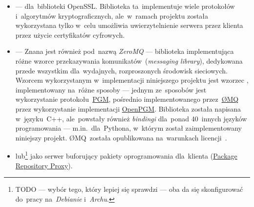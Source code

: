 \documentclass[thesis]{subfiles}
\begin{document}
\begin{itemize}
	\item {} ---  dla~biblioteki OpenSSL. Biblioteka ta~implementuje wiele protokołów i~algorytmów kryptograficznych, ale~w~ramach projektu została wykorzystana tylko w~celu umożliwia uwierzytelnienie serwera przez klienta przez użycie certyfikatów cyfrowych.
	\item {} --- Znana jest również pod~nazwą \emph{ZeroMQ} --- biblioteka implementująca różne wzorce przekazywania komunikatów~(\emph{messaging library}), dedykowana przede wszystkim dla~wydajnych, rozproszonych środowisk sieciowych. Wzorcem wykorzystanym w~implementacji niniejszego projektu jest wzorzec , implementowany na~różne sposoby --- jednym ze~sposobów jest wykorzystanie protokołu~\hyperref[sec:pgm]{PGM}, pośrednio implementowanego przez~\href{https://en.wikipedia.org/wiki/ZeroMQ}{ØMQ} przez wykorzystanie implementacji \href{https://github.com/steve-o/openpgm}{OpenPGM}. Biblioteka została napisana w~języku~C++, ale~powstały również \emph{bindingi} dla~ponad 40~innych języków programowania --- m.in.~dla~Pythona, w~którym został zaimplementowany niniejszy projekt. ØMQ~została opublikowana na~warunkach licencji~.
	\item {} lub\footnote{TODO --- wybór tego, który lepiej się sprawdzi --- oba da się skonfigurować do~pracy na~\emph{Debianie} i~\emph{Archu}.}  jako serwer buforujący pakiety oprogramowania dla~klienta (\href{https://lwn.net/Articles/318658/}{Package Repository Proxy}).

\end{itemize}
\end{document}
